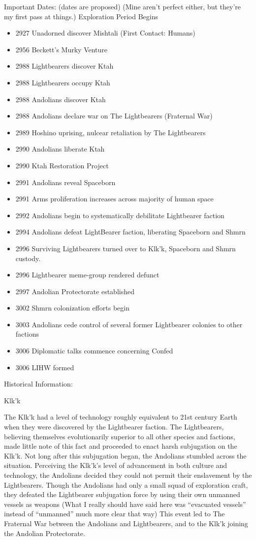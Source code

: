 Important Dates: (dates are proposed) (Mine aren't perfect either, but they're my first pass at things.)
Exploration Period Begins
\begin{itemize}
\item 2927 Unadorned discover Mishtali (First Contact: Humans)
\item 2956 Beckett's Murky Venture
\item 2988 Lightbearers discover Ktah
\item 2988 Lightbearers occupy Ktah
\item 2988 Andolians discover Ktah
\item 2988 Andolians declare war on The Lightbearers (Fraternal War)
\item 2989 Hoshino uprising, nulcear retaliation by The Lightbearers
\item 2990 Andolians liberate Ktah
\item 2990 Ktah Restoration Project
\item 2991 Andolians reveal Spaceborn
\item 2991 Arms proliferation increases across majority of human space
\item 2992 Andolians begin to systematically debilitate Lightbearer faction
\item 2994 Andolians defeat LightBearer faction, liberating Spaceborn and Shmrn
\item 2996 Surviving Lightbearers turned over to Klk'k, Spaceborn and Shmrn custody.
\item 2996 Lightbearer meme-group rendered defunct
\item 2997 Andolian Protectorate established
\item 3002 Shmrn colonization efforts begin
\item 3003 Andolians cede control of several former Lightbearer colonies to other factions
\item 3006 Diplomatic talks commence concerning Confed
\item 3006 LIHW formed
\end{itemize}

Historical Information:

Klk'k

The Klk'k had a level of technology roughly equivalent to 21st century
Earth when they were discovered by the Lightbearer faction. The
Lightbearers, believing themselves evolutionarily superior to all
other species and factions, made little note of this fact and
proceeded to enact harsh subjugation on the Klk'k. Not long after this
subjugation began, the Andolians stumbled across the
situation. Perceiving the Klk'k's level of advancement in both culture
and technology, the Andolians decided they could not permit their
enslavement by the Lightbearers. Though the Andolians had only a small
squad of exploration craft, they defeated the Lightbearer subjugation
force by using their own unmanned vessels as weapons (What I really
should have said here was ``evacuated vessels'' instead of
``unmanned'' much more clear that way) This event led to The Fraternal
War between the Andolians and Lightbearers, and to the Klk'k joining
the Andolian Protectorate.


